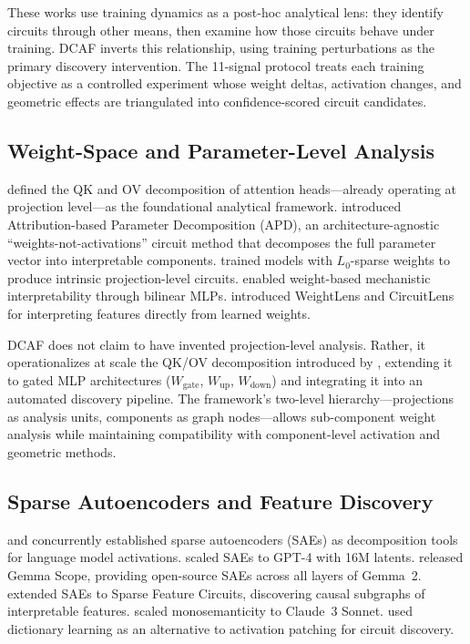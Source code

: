 \documentclass[11pt]{article}
\begin{document}
These works use training dynamics as a post-hoc analytical lens: they identify circuits through other means, then examine how those circuits behave under training. DCAF inverts this relationship, using training perturbations as the primary discovery intervention. The 11-signal protocol treats each training objective as a controlled experiment whose weight deltas, activation changes, and geometric effects are triangulated into confidence-scored circuit candidates.

\subsection{Weight-Space and Parameter-Level Analysis}
\label{sec:weight-space-parameter-level-analysis}

\citet{elhage2021mathematical} defined the QK and OV decomposition of attention heads---already operating at projection level---as the foundational analytical framework. \citet{braun2025apd} introduced Attribution-based Parameter Decomposition (APD), an architecture-agnostic ``weights-not-activations'' circuit method that decomposes the full parameter vector into interpretable components. \citet{gao2025weightsparse} trained models with $L_0$-sparse weights to produce intrinsic projection-level circuits. \citet{dooms2024bilinear} enabled weight-based mechanistic interpretability through bilinear MLPs. \citet{golimblevskaia2025circuitinsights} introduced WeightLens and CircuitLens for interpreting features directly from learned weights.

DCAF does not claim to have invented projection-level analysis. Rather, it operationalizes at scale the QK/OV decomposition introduced by \citet{elhage2021mathematical}, extending it to gated MLP architectures ($W_{\text{gate}}$, $W_{\text{up}}$, $W_{\text{down}}$) and integrating it into an automated discovery pipeline. The framework's two-level hierarchy---projections as analysis units, components as graph nodes---allows sub-component weight analysis while maintaining compatibility with component-level activation and geometric methods.

\subsection{Sparse Autoencoders and Feature Discovery}
\label{sec:sparse-autoencoders-feature-discovery}

\citet{cunningham2024sae} and \citet{bricken2023monosemanticity} concurrently established sparse autoencoders (SAEs) as decomposition tools for language model activations. \citet{gao2024scaling} scaled SAEs to GPT-4 with 16M latents. \citet{lieberum2024gemma} released Gemma Scope, providing open-source SAEs across all layers of Gemma~2. \citet{marks2025sparse} extended SAEs to Sparse Feature Circuits, discovering causal subgraphs of interpretable features. \citet{templeton2024scaling} scaled monosemanticity to Claude~3 Sonnet. \citet{he2024dictionary} used dictionary learning as an alternative to activation patching for circuit discovery.
\end{document}
